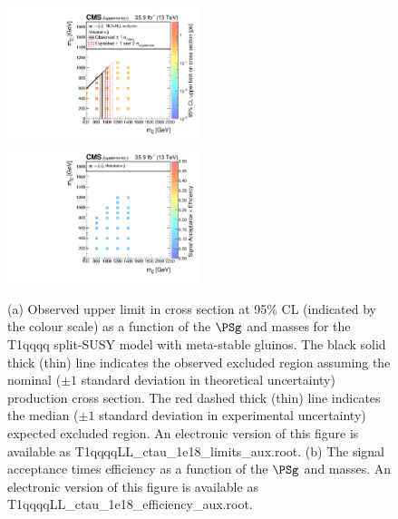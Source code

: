 \clearpage
\begin{figure}
    \begin{center}
            \includegraphics[width=0.50\textwidth]{Supplementary/T1qqqqLLStableXSEC}
	    \includegraphics[width=0.50\textwidth]{Supplementary/T1qqqqLL_ctau_1e18_efficiency_aux}
        \caption{ (a) Observed upper limit in cross section at 95\% CL (indicated
        by the colour scale) as a function of 
        the $\PSg$ and \PSGczDo %
        masses for the 
        T1qqqq split-SUSY model with meta-stable gluinos. 
         The  black  solid thick  (thin)  line indicates  the
        observed  excluded  region  assuming   the  nominal  (${\pm}1$  standard
        deviation in theoretical uncertainty)  production cross section. The red
        dashed  thick  (thin)  line  indicates  the  median  (${\pm}1$  standard
        deviation in experimental uncertainty) expected excluded region.
    An electronic version of this figure is available as T1qqqqLL\_ctau\_1e18\_limits\_aux.root.
        (b) The signal acceptance times efficiency as a function of 
        the $\PSg$ and \PSGczDo %
        masses.
    An electronic version of this figure is available as T1qqqqLL\_ctau\_1e18\_efficiency\_aux.root.
        }
        \label{fig:T1qqqqLL}
    \end{center}
\end{figure}

